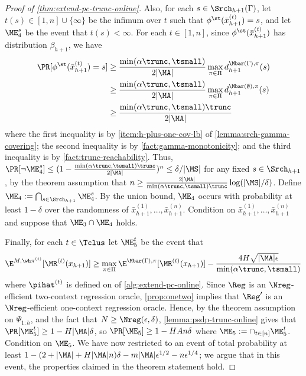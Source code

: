 \begin{proof}[Proof of \cref{thm:extend-pc-trunc-online}]
Also, for each $s \in \Srch_{h+1}(\Gamma)$, let $t(s) \in [1,n] \cup \{\infty\}$ be the infimum over $t$ such that $\phi^\st(\bar x^{(t)}_{h+1}) = s$, and let $\ME_4^s$ be the event that $t(s) < \infty$. For each $t \in [1,n]$, since $\phi^\st(\bar x^{(t)}_{h+1})$ has distribution $\beta_{h+1}$, we have 
\begin{align*}
\Pr[\phi^\st(\bar x^{(t)}_{h+1})=s] 
&\geq \frac{\min(\alpha\trunc,\tsmall)}{2|\MA|} \max_{\pi\in\Pi} d^{\Mbar(\Gamma),\pi}_{h+1}(s) \\ 
&\geq \frac{\min(\alpha\trunc,\tsmall)}{2|\MA|}  \max_{\pi\in\Pi} d^{\Mbar(\emptyset),\pi}_{h+1}(s) \\ &\geq \frac{\min(\alpha\trunc,\tsmall)\trunc}{2|\MA|} \end{align*}
where the first inequality is by \cref{item:h-plus-one-cov-lb} of \cref{lemma:srch-gamma-covering}; the second inequality is by \cref{fact:gamma-monotonicity}; and the third inequality is by \cref{fact:trunc-reachability}.
Thus, $\Pr[\lnot \ME_4^s] \leq (1-\frac{\min(\alpha\trunc,\tsmall)\trunc}{2|\MA|})^n \leq \delta/|\MS|$ for any fixed $s \in \Srch_{h+1}$, by the theorem assumption that $n \geq \frac{2|\MA|}{\min(\alpha\trunc,\tsmall)\trunc} \log(|\MS|/\delta)$. Define $\ME_4 := \bigcap_{s \in \Srch_{h+1}} \ME_4^s$. By the union bound, $\ME_4$ occurs with probability at least $1-\delta$ over the randomness of $\bar x_{h+1}^{(1)},\dots,\bar x_{h+1}^{(n)}$. Condition on $\bar x_{h+1}^{(1)},\dots,\bar x_{h+1}^{(n)}$ and suppose that $\ME_3 \cap \ME_4$ holds. 

Finally, for each $t \in \Tclus$ let $\ME_5^t$ be the event that
\[\E^{M,\wh \pi^{(t)}}[\MR^{(t)}(x_{h+1})] \geq \max_{\pi\in\Pi} \E^{\Mbar(\Gamma),\pi}[\MR^{(t)}(x_{h+1})] - \frac{4H\sqrt{|\MA|\epsilon}}{\min(\alpha\trunc,\tsmall)}\]
where $\pihat^{(t)}$ is defined on  of \cref{alg:extend-pc-online}. Since $\Reg$ is an $\Nreg$-efficient two-context regression oracle, \cref{prop:onetwo} implies that $\Reg'$ is an $\Nreg$-efficient one-context regression oracle. Hence, by the theorem assumption on $\Psi_{1:h}$, and the fact that $N \geq \Nreg(\epsilon,\delta)$, \cref{lemma:psdp-trunc-online} gives that $\Pr[\ME_5^t] \geq 1-H|\MA|\delta$, so $\Pr[\ME_5] \geq 1-HAn\delta$ where $\ME_5 := \cap_{t \in [n]} \ME_5^t$. Condition on $\ME_5$. We have now restricted to an event of total probability at least $1 - (2+|\MA|+H|\MA|n)\delta - m|\MA|\epsilon^{1/2} - n\epsilon^{1/4}$; we argue that in this event, the properties claimed in the theorem statement hold.


\end{proof}
